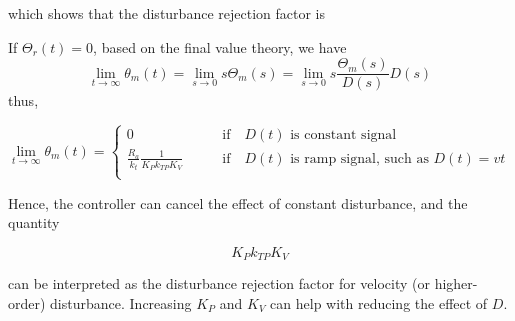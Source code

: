 \documentclass[10pt]{article}
\begin{document}
which shows that the disturbance rejection factor is


If $\Theta_r(t)=0$, based on the final value theory, we have
\begin{equation}
    \lim_{t\rightarrow \infty} {\theta_{m}(t)}= \lim_{s\rightarrow 0} s{\Theta_{m}(s)}=\lim_{s\rightarrow 0} s\frac{\Theta_{m}(s)}{D(s)}{D(s)}
\end{equation}
thus,

\begin{equation}
    \lim_{t\rightarrow \infty} {\theta_{m}(t)}= 
    \begin{cases}
        0\qquad &\text{if}\quad D(t)\,\,\text{is constant signal}\\
        \frac{R_a}{k_t}\frac{1}{K_{P} k_{T P} K_{V}} \qquad &\text{if}\quad D(t)\,\,\text{is ramp signal, such as $D(t)=vt$ }\\
    \end{cases}
\end{equation}

Hence, the controller can cancel the effect of constant disturbance, and the quantity

$$
K_{P} k_{T P} K_{V}
$$

can be interpreted as the disturbance rejection factor for velocity (or higher-order) disturbance. Increasing  $K_{P}$ and $K_V$ can help with reducing the effect of $D$.




 







\end{document}
